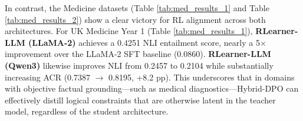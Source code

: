 \begin{table}[h]
\centering
{}
\caption{Cross-Domain Evaluation on the Auckland Law dataset. Qwen3-8B SFT achieves highest BLEU/BERT owing to stronger pre-training. RLearner-LLM (Qwen3) recovers substantial ACR gains (+28.9 pp) under zero-shot domain transfer.}
\label{tab:law_results}
\end{table}

In contrast, the Medicine datasets (Table \ref{tab:med_results_1} and Table \ref{tab:med_results_2}) show a clear victory for RL alignment across both architectures. For UK Medicine Year 1 (Table \ref{tab:med_results_1}), \textbf{RLearner-LLM (LLaMA-2)} achieves a 0.4251 NLI entailment score, nearly a 5$\times$ improvement over the LLaMA-2 SFT baseline (0.0860). \textbf{RLearner-LLM (Qwen3)} likewise improves NLI from 0.2457 to 0.2104 while substantially increasing ACR (0.7387 $\rightarrow$ 0.8195, +8.2 pp). This underscores that in domains with objective factual grounding---such as medical diagnostics---Hybrid-DPO can effectively distill logical constraints that are otherwise latent in the teacher model, regardless of the student architecture.

